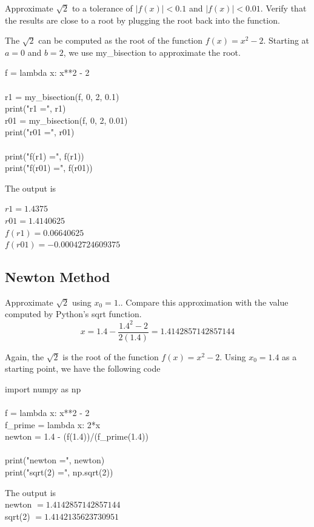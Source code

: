 \begin{example}
Approximate $\sqrt{2}$ to a tolerance of $|f(x)|<0.1$ and $|f(x)|<0.01$. Verify that the results are close to a root by plugging the root back into the function.
\end{example}

\begin{mysolution}
The $\sqrt{2}$ can be computed as the root of the function $f(x)=x^2-2$. Starting at $a=0$ and $b=2$, we use my\_bisection to approximate the root.


\begin{boxB}
f = lambda x: x**2 - 2\\
\\
r1 = my\_bisection(f, 0, 2, 0.1)\\
print("r1 =", r1)\\
r01 = my\_bisection(f, 0, 2, 0.01)\\
print("r01 =", r01)\\
\\
print("f(r1) =", f(r1))\\
print("f(r01) =", f(r01))\\
\end{boxB}

The output is

$r1 = 1.4375$\\
$r01 = 1.4140625$\\
$f(r1) = 0.06640625$\\
$f(r01) = -0.00042724609375$
\end{mysolution}

\subsection*{Newton Method}

\begin{example}
Approximate $\sqrt{2}$ using $x_0=1.$. Compare this approximation with the value computed by Python’s sqrt function.
\[x=1.4-\frac{1.4^2-2}{2(1.4)}=1.4142857142857144\]
\end{example}

\begin{mysolution}
Again, the $\sqrt{2}$ is the root of the function $f(x)=x^2-2$. Using $x_0=1.4$ as a starting point, we have the following code
\begin{boxB}
import numpy as np\\
\\
f = lambda x: x**2 - 2\\
f\_prime = lambda x: 2*x\\
newton = 1.4 - (f(1.4))/(f\_prime(1.4))\\
\\
print("newton =", newton)\\
print("sqrt(2) =", np.sqrt(2))
\end{boxB}

The output is\\
newton $= 1.4142857142857144$\\
sqrt(2) $= 1.4142135623730951$
\end{mysolution}

